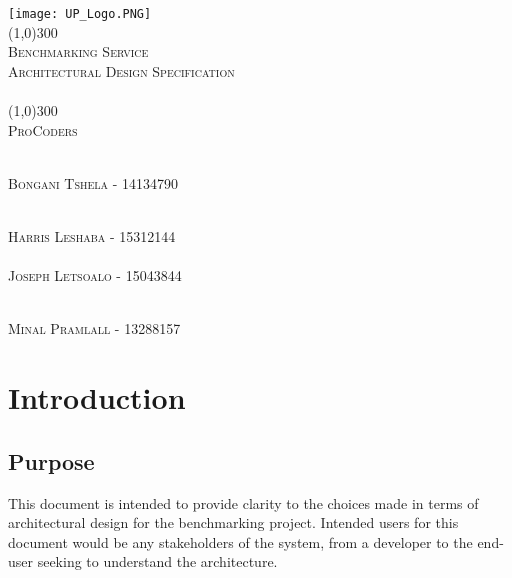 \documentclass[runningheads,a4paper]{article}
\begin{document}
	
\begin{titlepage}
	\begin{center}
		\texttt{[image: UP\_Logo.PNG]}  \\
		[1cm]
		\line(1,0){300} \\
		[0.3cm]
		\textsc{\Large
			Benchmarking Service\\
			Architectural Design Specification\\
			\hfill
		}\\
		[0.1cm]
		\line(1,0){300} \\
		[0.7cm]
		\textsc{\Large
			ProCoders
		} \\
	\end{center}
	
	\begin{center}
		\begin{centre}
			\textsc{\large\\
				Bongani Tshela - 14134790\\ 
			}
		
				\textsc{\large\\
					Harris Leshaba - 15312144\\ 
				}
			\textsc{\large\\
				Joseph Letsoalo - 15043844\\ 
			}
			
			\textsc{\large\\
				Minal Pramlall - 13288157\\ 
			}
			

            

		\end{centre}
		
		
		
	\end{center}
\end{titlepage}

\begingroup

\tableofcontents
{}
\endgroup
\newpage
\section{Introduction}

\subsection{Purpose}
This document is intended to provide clarity to the choices made in terms of architectural design for the benchmarking project. Intended users for this document would be any stakeholders of the system, from a developer to the end-user seeking to understand the architecture.
\end{document}
